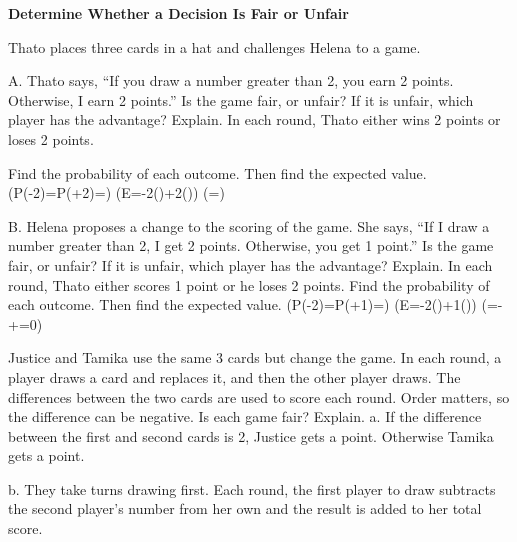 \documentclass{article}
\newenvironment{example}[1]{}{}         %
\newenvironment{tryit}[1]{}{}           %
\newcommand{\answer}[1]{}               %
\newcommand{\placeholder}[2]{}          %
\newcommand{\te}[1]{}                   %
\begin{document}
\begin{example}{2}
\textbf{Determine Whether a Decision Is Fair or Unfair}
\te{CONCEPTUAL UNDERSTANDING.}
Thato places three cards in a hat and challenges Helena to a game.
\placeholder{illustration}{Brown hat holding three colored cards labeled 1, 2, and 3.}
A. Thato says, ``If you draw a number greater than 2, you earn 2 points. Otherwise, I earn 2 points.'' Is the game fair, or unfair? If it is unfair, which player has the advantage? Explain.
In each round, Thato either wins 2 points or loses 2 points.
\te{If Helena draws a ``3'' and gets 2 points, Thato considers this a loss of 2 points for himself.}
Find the probability of each outcome. Then find the expected value.
(P(-2)=P(+2)=)
(E=-2\cdot()+2\cdot())
(=)
\te{A game is considered ``fair'' if and only if the expected value is 0.}
\answer{The game is unfair and is skewed to Thato's advantage. The probability of his scoring 2 points is twice the probability of Helena scoring 2 points.}
\te{COMMON ERROR. Recall that the expected value is the sum of the products of the outcomes' values by their respective probabilities. Be careful not to use the sum of the probabilities.}
B. Helena proposes a change to the scoring of the game. She says, ``If I draw a number greater than 2, I get 2 points. Otherwise, you get 1 point.'' Is the game fair, or unfair? If it is unfair, which player has the advantage? Explain.
In each round, Thato either scores 1 point or he loses 2 points.
Find the probability of each outcome. Then find the expected value.
(P(-2)=P(+1)=)
(E=-2\cdot()+1\cdot())
(=-+=0)
\answer{This is a fair game because the expected value is 0. Neither player has an advantage over the other.}
\end{example}
\begin{tryit}{2}
Justice and Tamika use the same 3 cards but change the game. In each round, a player draws a card and replaces it, and then the other player draws. The differences between the two cards are used to score each round. Order matters, so the difference can be negative. Is each game fair? Explain.
a. If the difference between the first and second cards is 2, Justice gets a point. Otherwise Tamika gets a point.
\answer{a. No; there are more ways for Tamika to score a point.}
b. They take turns drawing first. Each round, the first player to draw subtracts the second player's number from her own and the result is added to her total score.
\answer{b. Yes; the expected value is 0, the possible scores are (-2), (-1), 0, 1, and 2, and each player has the same probability of getting each score.}
\end{tryit}
\end{document}
